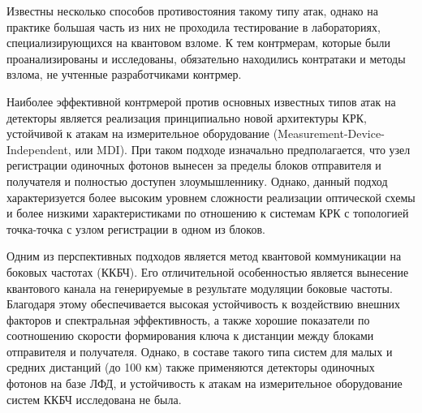 	Известны несколько способов противостояния такому типу атак, однако на практике большая часть из них не проходила тестирование в лабораториях, специализирующихся на квантовом взломе. К тем контрмерам, которые были проанализированы и исследованы, обязательно находились контратаки и методы взлома, не учтенные разработчиками контрмер. 
	
	Наиболее эффективной контрмерой против основных известных типов атак на детекторы является реализация принципиально новой архитектуры КРК, устойчивой к атакам на измерительное оборудование (Measurement-Device-Independent, или MDI). При таком подходе изначально предполагается, что узел регистрации одиночных фотонов вынесен за пределы блоков отправителя и получателя и полностью доступен злоумышленнику. Однако, данный подход характеризуется более высоким уровнем сложности реализации оптической схемы и более низкими характеристиками по отношению к системам КРК с топологией точка-точка с узлом регистрации в одном из блоков. 
	
	Одним из перспективных подходов является метод квантовой коммуникации на боковых частотах (ККБЧ). Его отличительной особенностью является вынесение квантового канала на генерируемые в результате модуляции боковые частоты. Благодаря этому обеспечивается высокая устойчивость к воздействию внешних факторов и спектральная эффективность, а также хорошие показатели по соотношению скорости формирования ключа к дистанции между блоками отправителя и получателя. Однако, в составе такого типа систем для малых и средних дистанций (до 100 км) также применяются детекторы одиночных фотонов на базе ЛФД, и устойчивость к атакам на измерительное оборудование систем ККБЧ исследована не была. 

